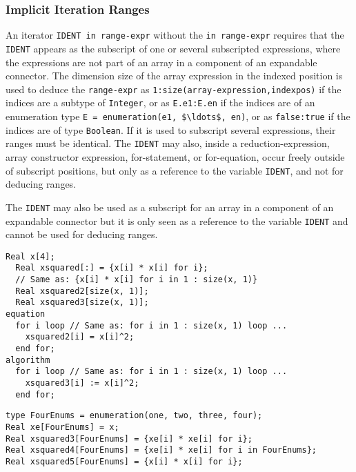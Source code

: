 \subsubsection{Implicit Iteration Ranges}\label{implicit-iteration-ranges}

An iterator \lstinline!IDENT in range-expr! without the \lstinline!in range-expr! requires that the \lstinline!IDENT! appears as the subscript of one or several subscripted expressions, where the expressions are not part of an array in a component of an expandable connector.  The dimension size of the array expression in the indexed position is used to deduce the \lstinline!range-expr! as \lstinline!1:size(array-expression,indexpos)! if the indices are a subtype of \lstinline!Integer!, or as \lstinline!E.e1:E.en! if the indices are of an enumeration type \lstinline!E = enumeration(e1, $\ldots$, en)!, or as \lstinline!false:true! if the indices are of type \lstinline!Boolean!.  If it is used to subscript several expressions, their ranges must be identical.  The \lstinline!IDENT! may also, inside a reduction-expression, array constructor expression, for-statement, or for-equation, occur freely outside of subscript positions, but only as a reference to the variable \lstinline!IDENT!, and not for deducing ranges.

The \lstinline!IDENT! may also be used as a subscript for an array in a component of an expandable connector
but it is only seen as a reference to the variable \lstinline!IDENT! and cannot be used for deducing ranges.

\begin{example}
\begin{lstlisting}[language=modelica]
  Real x[4];
  Real xsquared[:] = {x[i] * x[i] for i};
  // Same as: {x[i] * x[i] for i in 1 : size(x, 1)}
  Real xsquared2[size(x, 1)];
  Real xsquared3[size(x, 1)];
equation
  for i loop // Same as: for i in 1 : size(x, 1) loop ...
    xsquared2[i] = x[i]^2;
  end for;
algorithm
  for i loop // Same as: for i in 1 : size(x, 1) loop ...
    xsquared3[i] := x[i]^2;
  end for;
\end{lstlisting}

\begin{lstlisting}[language=modelica]
type FourEnums = enumeration(one, two, three, four);
Real xe[FourEnums] = x;
Real xsquared3[FourEnums] = {xe[i] * xe[i] for i};
Real xsquared4[FourEnums] = {xe[i] * xe[i] for i in FourEnums};
Real xsquared5[FourEnums] = {x[i] * x[i] for i};
\end{lstlisting}
\end{example}

